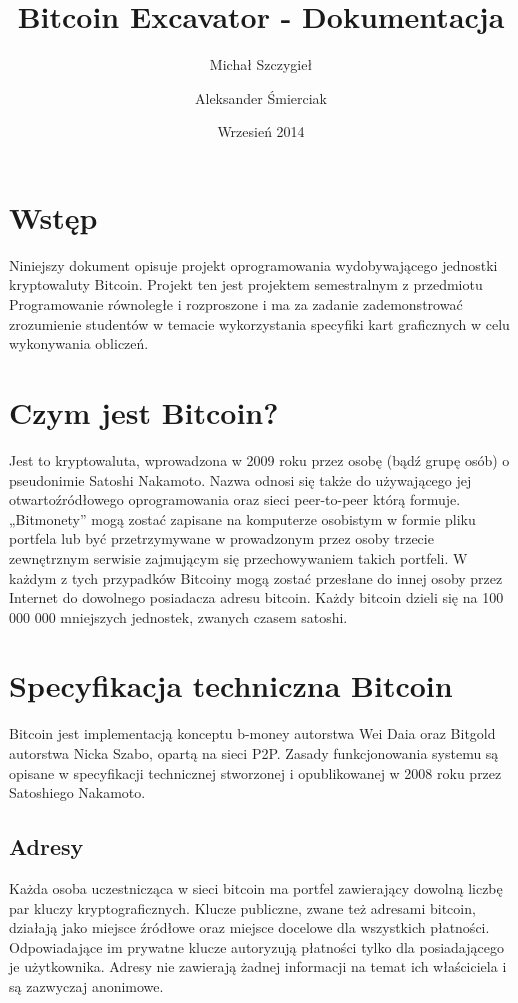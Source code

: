 \documentclass[11pt,a4paper]{article}
\title{Bitcoin Excavator - Dokumentacja}
\author{Michał Szczygieł \and Aleksander Śmierciak}
\date{Wrzesień 2014}
\begin{document}
\maketitle

\tableofcontents

\section{Wstęp}

Niniejszy dokument opisuje projekt oprogramowania wydobywającego jednostki kryptowaluty Bitcoin. Projekt ten jest projektem semestralnym z przedmiotu Programowanie równoległe i rozproszone i ma za zadanie zademonstrować zrozumienie studentów w temacie wykorzystania specyfiki kart graficznych w celu wykonywania obliczeń.

\section{Czym jest Bitcoin?}
Jest to kryptowaluta, wprowadzona w 2009 roku przez osobę (bądź grupę osób) o pseudonimie Satoshi Nakamoto. Nazwa odnosi się także do używającego jej otwartoźródłowego oprogramowania oraz sieci peer-to-peer którą formuje. „Bitmonety” mogą zostać zapisane na komputerze osobistym w formie pliku portfela lub być przetrzymywane w prowadzonym przez osoby trzecie zewnętrznym serwisie zajmującym się przechowywaniem takich portfeli. W każdym z tych przypadków Bitcoiny mogą zostać przesłane do innej osoby przez Internet do dowolnego posiadacza adresu bitcoin. Każdy bitcoin dzieli się na 100 000 000 mniejszych jednostek, zwanych czasem satoshi.


\section{Specyfikacja techniczna Bitcoin}

Bitcoin jest implementacją konceptu b-money autorstwa Wei Daia oraz Bitgold autorstwa Nicka Szabo, opartą na sieci P2P. Zasady funkcjonowania systemu są opisane w specyfikacji technicznej stworzonej i opublikowanej w 2008 roku przez Satoshiego Nakamoto.

\subsection{Adresy}

Każda osoba uczestnicząca w sieci bitcoin ma portfel zawierający dowolną liczbę par kluczy kryptograficznych. Klucze publiczne, zwane też adresami bitcoin, działają jako miejsce źródłowe oraz miejsce docelowe dla wszystkich płatności. Odpowiadające im prywatne klucze autoryzują płatności tylko dla posiadającego je użytkownika. Adresy nie zawierają żadnej informacji na temat ich właściciela i są zazwyczaj anonimowe.
\end{document}
